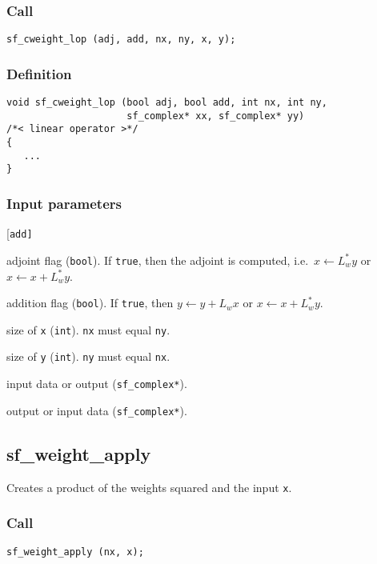 \subsubsection*{Call}
\begin{verbatim}sf_cweight_lop (adj, add, nx, ny, x, y);\end{verbatim}

\subsubsection*{Definition}
\begin{verbatim}
void sf_cweight_lop (bool adj, bool add, int nx, int ny, 
                     sf_complex* xx, sf_complex* yy)
/*< linear operator >*/
{
   ...
}
\end{verbatim}

\subsubsection*{Input parameters}
\begin{desclist}{\tt }{\quad}[\tt add]
   \setlength\itemsep{0pt}
   \item[adj] adjoint flag (\texttt{bool}). If \texttt{true}, then the adjoint is computed, i.e.~$x\leftarrow L_w^*y$ or $x\leftarrow x+L_w^*y$. 
   \item[add] addition flag (\texttt{bool}). If \texttt{true}, then $y\leftarrow y+L_wx$ or $x\leftarrow x+L_w^*y$.  
   \item[nx]  size of \texttt{x} (\texttt{int}). \texttt{nx} must equal \texttt{ny}. 
   \item[ny]  size of \texttt{y} (\texttt{int}). \texttt{ny} must equal \texttt{nx}. 
   \item[x]   input data or output (\texttt{sf\_complex*}).
   \item[y]   output or input data (\texttt{sf\_complex*}).
\end{desclist}




\subsection{{sf\_weight\_apply}}\label{sec:sf_weight_apply}
Creates a product of the weights squared and the input \texttt{x}.

\subsubsection*{Call}
\begin{verbatim}sf_weight_apply (nx, x);\end{verbatim}

